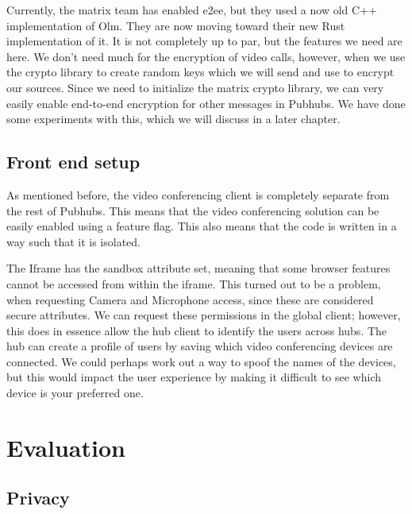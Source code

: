 \documentclass{report}
\begin{document}
Currently, the matrix team has enabled e2ee, but they used a now old C++ implementation of Olm. They are now moving
toward their new Rust implementation of it. It is not completely up to par, but the features we need are here. We
don't need much for the encryption of video calls, however, when we use the crypto library to create random keys
which we will send and use to encrypt our sources. Since we need to initialize the matrix crypto library, we can
very easily enable end-to-end encryption for other messages in Pubhubs. We have done some experiments with this,
which we will discuss in a later chapter.


\section{Front end setup}
As mentioned before, the video conferencing client is completely separate from the rest of Pubhubs. This means that
the video conferencing solution can be easily enabled using a feature flag. This also means that the code is
written in a way such that it is isolated.

The Iframe has the sandbox attribute set, meaning that some browser features cannot be accessed from within the
iframe. This turned out to be a problem, when requesting Camera and Microphone access, since these are considered
secure attributes. We can request these permissions in the global client; however, this does in essence allow the
hub client to identify the users across hubs. The hub can create a profile of users by saving which video
conferencing devices are connected. We could perhaps work out a way to spoof the names of the devices, but this
would impact the user experience by making it difficult to see which device is your preferred one.

\chapter{Evaluation}
\section{Privacy}

\end{document}
